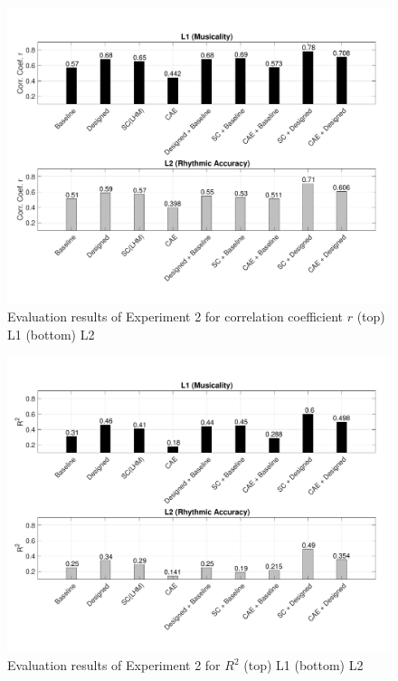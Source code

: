 \documentclass{ws-ijsc}
\begin{document}





\begin{figure}
\centering
\includegraphics[width = \linewidth]{./figs/results_r.pdf}
\caption{Evaluation results of Experiment 2 for correlation coefficient $r$ (top) L1 (bottom) L2}
\label{fig:exp2}
\end{figure}

\begin{figure}
\centering
\includegraphics[width = \linewidth]{./figs/results_R2.pdf}
\caption{Evaluation results of Experiment 2 for $R^2$ (top) L1 (bottom) L2}
\label{fig:exp2_2}
\end{figure}
\end{document}
